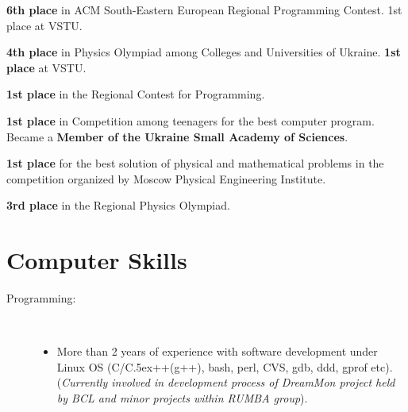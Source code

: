 \documentclass[10pt,overlapped,line]{res}
\def\Cplusplus{{\rm C\raise.5ex\hbox{\small ++}}}
\newcommand{\mplace}[1]{\textbf{#1}}
\newcommand{\wdescription}[1]{({\small \textit{#1}})}
\begin{document}
\begin{resume}
\begin{position}
  \mplace{6th place} in ACM South-Eastern European Regional
  Programming Contest. 1st place at VSTU.
\end{position}

\begin{position}
  \mplace{4th place} in Physics Olympiad among Colleges and
  Universities of Ukraine. \mplace{1st place} at VSTU.
\end{position}

\begin{position}
\mplace{1st place} in the Regional Contest for Programming.
\end{position}

\begin{position}
  \mplace{1st place} in Competition among teenagers for the best
  computer program. Became a \mplace{Member of the Ukraine Small Academy
    of Sciences}.
\end{position}

\begin{position}
  \mplace{1st place} for the best solution of physical and mathematical
  problems in the competition organized by Moscow Physical Engineering Institute.
\end{position}

\begin{position}
  \mplace{3rd place} in the Regional Physics Olympiad.

\end{position}

\section{Computer Skills}
 \begin{description}
   \item[Programming:] \hspace*{\fill} \\
     \begin{itemize}
     \item More than 2 years of experience with software development
       under Linux OS (C/\Cplusplus(g++), bash, perl, CVS, gdb, ddd,
       gprof etc).  \wdescription{Currently involved in development
         process of DreamMon project held by BCL and minor projects within
         RUMBA group}.


\end{itemize}
\end{description}
\end{resume}
\end{document}
